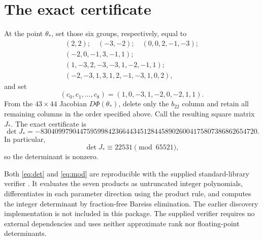 \documentclass[11pt]{article}
\begin{document}
\section{The exact certificate}
At the point $\theta_*$, set those six groups, respectively, equal to
\[
\begin{gathered}
(2,2);\quad(-3,-2);\quad(0,0,2,-1,-3);\\
(-2,0,-1,3,-1,1);\\
(1,-3,2,-3,-3,1,-2,-1,1);\\
(-2,-3,1,3,1,2,-1,-3,1,0,2),
\end{gathered}
\]
and set
\[
(c_0,c_1,\ldots,c_8)=(1,0,-3,1,-2,0,-2,1,1).
\]
From the $43\times44$ Jacobian $D\Phi(\theta_*)$, delete only the $b_{22}$ column and retain all remaining columns in the order specified above. Call the resulting square matrix $J_*$. The exact certificate is
\begin{equation}\label{eq:det}
\det J_*=-8304099790447595998423664434512844589026004175807386862654720.
\end{equation}
In particular,
\begin{equation}\label{eq:mod}
\det J_*\equiv22531\pmod{65521},
\end{equation}
so the determinant is nonzero.

Both \eqref{eq:det} and \eqref{eq:mod} are reproducible with the supplied standard-library verifier . It evaluates the seven products as untruncated integer polynomials, differentiates in each parameter direction using the product rule, and computes the integer determinant by fraction-free Bareiss elimination. The earlier discovery implementation is not included in this package. The supplied verifier requires no external dependencies and uses neither approximate rank nor floating-point determinants.
\end{document}
